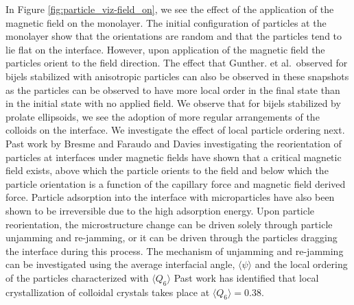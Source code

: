 In Figure \ref{fig:particle_viz-field_on}, we see the effect of the
application of the magnetic field on the monolayer. The initial
configuration of particles at the monolayer show that the orientations
are random and that the particles tend to lie flat on the interface.
However, upon application of the magnetic field the particles orient to
the field direction. The effect that Gunther. et al.~observed for bijels
stabilized with anisotropic particles can also be observed in these
snapshots as the particles can be observed to have more local order in
the final state than in the initial state with no applied field. We
observe that for bijels stabilized by prolate ellipsoids, we see the
adoption of more regular arrangements of the colloids on the interface.
We investigate the effect of local particle ordering next. Past work by
Bresme and Faraudo and Davies investigating the reorientation of
particles at interfaces under magnetic fields have shown that a critical
magnetic field exists, above which the particle orients to the field and
below which the particle orientation is a function of the capillary
force and magnetic field derived force. \cite{davies_interface_2014}
\cite{bresme_orientational_2007} Particle adsorption into the interface
with microparticles have also been shown to be irreversible due to the
high adsorption energy. Upon particle reorientation, the microstructure
change can be driven solely through particle unjamming and re-jamming,
or it can be driven through the particles dragging the interface during
this process. The mechanism of unjamming and re-jamming can be
investigated using the average interfacial angle, $\langle \psi \rangle$
and the local ordering of the particles characterized with 
$\langle Q_6 \rangle$ Past work has identified that local crystallization 
of colloidal crystals takes place at \(\langle Q_6 \rangle = 0.38\). 
\cite{toxvaerd_role_2020}

